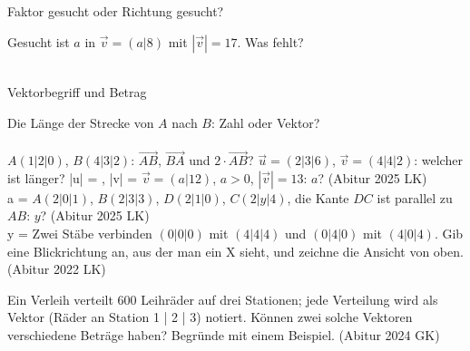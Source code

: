 \setcounter{aufgabe}{8}

\begin{aufgabe}{Faktor gesucht oder Richtung gesucht?}
\begin{teile}
\teil Gesucht ist $a$ in $\vec v = (a | 8)$ mit $|\vec v| = 17$. Was fehlt? \\  \\ 
\end{teile}
\end{aufgabe}

\begin{aufgabe}{Vektorbegriff und Betrag}
\begin{teile}
\teil Die Länge der Strecke von $A$ nach $B$: Zahl oder Vektor? \\  \\ 
\teil $A(1 | 2 | 0)$, $B(4 | 3 | 2)$: $\overrightarrow{AB}$, $\overrightarrow{BA}$ und $2 \cdot \overrightarrow{AB}$?
\teil $\vec u = (2 | 3 | 6)$, $\vec v = (4 | 4 | 2)$: welcher ist länger? |u| = \leerfeld , |v| = \leerfeld
\teil $\vec v = (a | 12)$, $a > 0$, $|\vec v| = 13$: $a$? \hfill (Abitur 2025 LK) \\ a = \leerfeld
\teil $A(2 | 0 | 1)$, $B(2 | 3 | 3)$, $D(2 | 1 | 0)$, $C(2 | y | 4)$, die Kante $DC$ ist parallel zu $AB$: $y$? \hfill (Abitur 2025 LK) \\ y = \leerfeld
\teil Zwei Stäbe verbinden $(0 | 0 | 0)$ mit $(4 | 4 | 4)$ und $(0 | 4 | 0)$ mit $(4 | 0 | 4)$. Gib eine Blickrichtung an, aus der man ein X sieht, und zeichne die Ansicht von oben. \hfill (Abitur 2022 LK)

\begin{ksys3}   \end{ksys3} \begin{ksys}[xmin=0,xmax=5,ymin=0,ymax=5,xlabel=$x_1$,ylabel=$x_2$] \end{ksys}
\teil Ein Verleih verteilt 600 Leihräder auf drei Stationen; jede Verteilung wird als Vektor (Räder an Station 1 | 2 | 3) notiert. Können zwei solche Vektoren verschiedene Beträge haben? Begründe mit einem Beispiel. \hfill (Abitur 2024 GK)
\end{teile}
\end{aufgabe}

